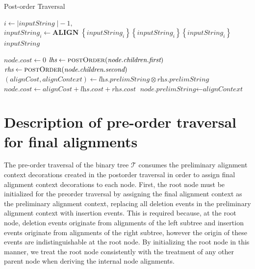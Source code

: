 \documentclass[11pt]{article}
\begin{document}
\begin{algorithm}
  \caption{Post-order Traversal}\label{postOrder}
  \begin{algorithmic}[1]
    \Ensure{$\Sigma_{\Gamma}^{*}$ }
      \State $i \gets \vert\textit{inputString} \;\vert - 1,$
        \State $\textit{inputString}_i \gets \textbf{ALIGN} \; \left\{ \textit{inputString}_i\right\} \left\{ \textit{inputString}_i \right\} \left\{ \textit{inputString}_i \right\}$
      \EndWhile
      \Return $\textit{inputString}$
    \EndFunction

        \State $\textit{node.cost} \gets 0$
      \Else
        \State $\textit{lhs}  \gets \Call{postOrder}{\textit{node.children.first}}$
        \State $\textit{rhs}  \gets \Call{postOrder}{\textit{node.children.second}}$
        \State $\left(\textit{alignCost}, \textit{alignContext}\right) \gets \textit{lhs.prelimString} \otimes \textit{rhs.prelimString}$
        \State $\textit{node.cost} \gets \textit{alignCost} + \textit{lhs.cost} + \textit{rhs.cost}$
        \State $\textit{node.prelimString} \gets \textit{alignContext}$
      \EndIf
    \EndFunction
  \end{algorithmic}
\end{algorithm}


\section{Description of pre-order traversal for final alignments}
The pre-order traversal of the binary tree $\mathcal{T}$ consumes the preliminary alignment context decorations created in the postorder traversal in order to assign final alignment context decorations to each node.
First, the root node must be initialized for the preorder traversal by assigning the final alignment context as the preliminary alignment context, replacing all deletion events in the preliminary alignment context with insertion events.
This is required because, at the root node, deletion events originate from alignments of the left subtree and insertion events originate from alignments of the right subtree, however the origin of these events are indistinguishable at the root node.
By initializing the root node in this manner, we treat the root node consistently with the treatment of any other parent node when deriving the internal node alignments.
\end{document}
